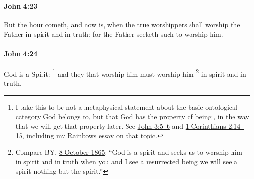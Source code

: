 		\paragraph{John 4:23} %
			\label{JOHN-4-23}

			But the hour cometh, and now is, when the true worshippers shall worship the Father in spirit and in truth: for the Father seeketh such to worship him.

			\begin{framed}
			\scriptsize
				\begin{compactdesc}
					\item[SBLG] 
				\end{compactdesc}
			\end{framed}

		\paragraph{John 4:24} %
			\label{JOHN-4-24}

			God is a Spirit:%
				\footnote{%
					I take this to be not a metaphysical statement about the basic ontological category God belongs to, but that God has the property of being , in the way that we will get that property later. See \hyperref[JOHN-3-5]{John 3:5--6} and \hyperref[1CORINTHIANS-2-14]{1 Corinthians 2:14--15}, including my Rainbows essay on that topic.
					}
			and they that worship him must worship him%
				\footnote{%
					Compare BY, \hyperref[EMS-1865-BY-8-OCT-1865]{8 October 1865}: ``God is a spirit and seeks us to worship him in spirit and in truth when you and I see a resurrected being we will see a spirit nothing but the spirit.''
					} 
			in spirit and in truth.

